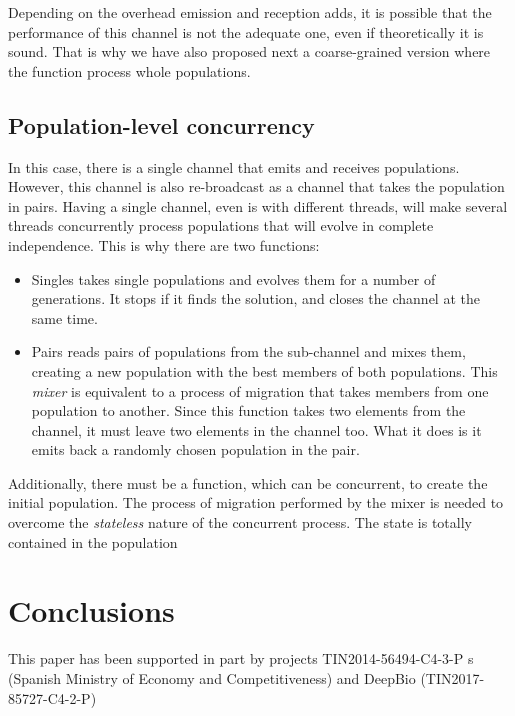 \documentclass[sigconf]{acmart}
\begin{document}
Depending on the overhead emission and reception adds, it is possible
that the performance of this channel is not the adequate one, even if
theoretically it is sound. That is why we have also proposed next a
coarse-grained version where the function process whole populations.

\subsection{Population-level concurrency}

In this case, there is a single channel that emits and receives
populations. However, this channel is also re-broadcast as a channel
that takes the population in pairs. Having a single channel, even is with
different threads, will make several threads concurrently process
populations that will evolve in complete independence. This is why
there are two functions: \begin{itemize}
\item {\sf Singles} takes single populations and evolves them for a
  number of generations. It stops if it finds the solution, and closes
  the channel at the same time.
\item {\sf Pairs} reads pairs of populations from the sub-channel and
  mixes them, creating a new population with the best members of both
  populations. This {\em mixer} is equivalent to a process of
  migration that takes members from one population to another. Since
  this function takes two elements from the channel, it must leave two
  elements in the channel too. What it does is it emits back a
  randomly chosen population in the pair. 
\end{itemize}

Additionally, there must be a function, which can be concurrent, to
create the initial population. The process of migration performed by
the mixer is needed to overcome the {\em stateless}
nature of the concurrent process. The state is totally contained in
the population


\section{Conclusions}
\label{sec:conclusions}

\begin{acks}

  This paper has been supported in part by
projects TIN2014-56494-C4-3-P s (Spanish Ministry of Economy and
Competitiveness) and DeepBio (TIN2017-85727-C4-2-P)


\end{acks}




\end{document}
